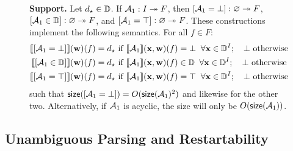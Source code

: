 \begin{figure}[H]
\begin{dtbox}
\textbf{Support.}
Let $d_\star \in \mathbb{D}$.
If $\mathcal{A}_1: I \twoheadrightarrow F$,
then
$[\mathcal{A}_1 = \bot]: \varnothing \twoheadrightarrow F$, $[\mathcal{A}_1 \in \mathbb{D}]: \varnothing \twoheadrightarrow F$, and $[\mathcal{A}_1 = \top]: \varnothing \twoheadrightarrow F$.
These constructions implement the following semantics.
For all $f \in F$:
\begin{align*}
\llbracket [\mathcal{A}_1 = \bot] \rrbracket(\mathbf{w})(f)
    &= d_{\star} \text{ if } \llbracket \mathcal{A}_1 \rrbracket(\mathbf{x},\mathbf{w})(f) = \bot \;\;\forall \mathbf{x} \in \mathbb{D}^{I}; \quad\bot \text{ otherwise} \\
\llbracket [\mathcal{A}_1 \in \mathbb{D}] \rrbracket(\mathbf{w})(f)
    &= d_{\star} \text{ if } \llbracket \mathcal{A}_1 \rrbracket(\mathbf{x},\mathbf{w})(f) \in \mathbb{D} \;\;\forall \mathbf{x} \in \mathbb{D}^{I}; \quad\bot \text{ otherwise} \\
\llbracket [\mathcal{A}_1 = \top] \rrbracket(\mathbf{w})(f)
    &= d_{\star} \text{ if } \llbracket \mathcal{A}_1 \rrbracket(\mathbf{x},\mathbf{w})(f) = \top \;\;\forall \mathbf{x} \in \mathbb{D}^{I}; \quad\bot \text{ otherwise}
\end{align*}
such that $\mathsf{size}([\mathcal{A}_1 = \bot]) = O(\mathsf{size}(\mathcal{A}_1)^2)$ and likewise for the other two. Alternatively, if $\mathcal{A}_1$ is acyclic, the size will only be $O(\mathsf{size}(\mathcal{A}_1))$.
\end{dtbox}

\label{dt:fig:support}
\end{figure}


\subsection{Unambiguous Parsing and Restartability}
\label{dt:subsec:constructions-restartable}
\label{dt:subsec:restartability}

